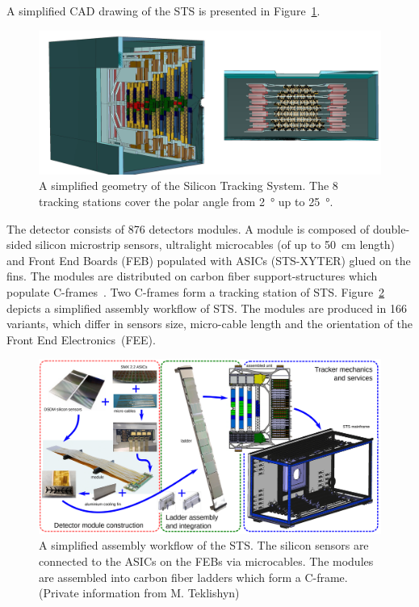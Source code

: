 A simplified CAD drawing of the \gls{STS} is presented in Figure~\ref{fig_STS}. 

\begin{figure}[!h]
\centering
\includegraphics[width=0.85\columnwidth]{Chapter2/images/STS.png}
\caption{A simplified geometry of the Silicon Tracking System. The 8 tracking stations cover the polar angle from \SI{2}{\degree} up to \SI{25}{\degree}.}
\label{fig_STS}
\end{figure}

The detector consists of 876 detectors modules. A module is composed of double-sided silicon microstrip sensors, ultralight microcables (of up to 50~cm length) and Front End Boards (\gls{FEB}) populated with ASICs (STS-XYTER) glued on the fins. The modules are distributed on carbon fiber support-structures which populate C-frames~\cite{progress_report_2016}. Two C-frames form a tracking station of \gls{STS}.  Figure~\ref{fig_assembly} depicts a simplified assembly workflow of \gls{STS}.
The modules are produced in 166 variants, which differ in sensors size, micro-cable length and the orientation of the Front End Electronics~(\gls{FEE}).  
\newpage
\begin{figure}[!h]
\centering
\includegraphics[width=1\columnwidth]{Chapter2/images/assembly_sequence.png}
\caption{A simplified assembly workflow of the \gls{STS}. The silicon sensors are connected to the ASICs on the \glspl{FEB} via microcables. The modules are assembled into carbon fiber ladders which form a C-frame. (Private information from M. Teklishyn)}
\label{fig_assembly}
\end{figure}

